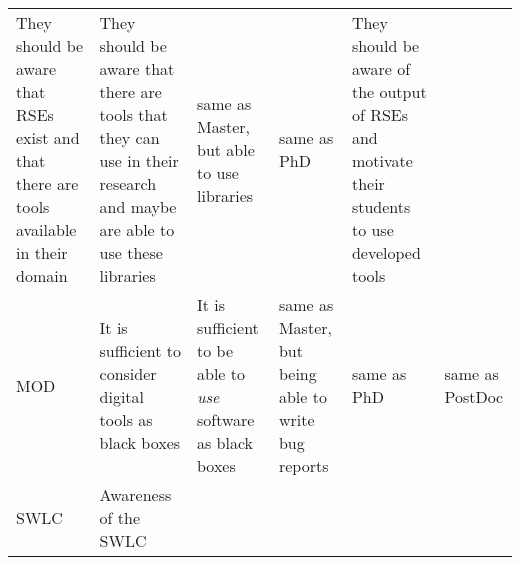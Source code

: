 \documentclass[a4paper
]{article}
\begin{document}
\begin{landscape}
\begin{longtable}[]{@{}llllll@{}}
\begin{minipage}[t]{0.18\columnwidth}
They should be aware that RSEs exist and that there are tools available
in their domain\strut
\end{minipage} & \begin{minipage}[t]{0.18\columnwidth}\raggedright
They should be aware that there are tools that they can use in their
research and maybe are able to use these libraries\strut
\end{minipage} & \begin{minipage}[t]{0.09\columnwidth}\raggedright
same as Master, but able to use libraries\strut
\end{minipage} & \begin{minipage}[t]{0.18\columnwidth}\raggedright
same as PhD\strut
\end{minipage} & \begin{minipage}[t]{0.09\columnwidth}\raggedright
They should be aware of the output of RSEs and motivate their students
to use developed tools\strut
\end{minipage}\tabularnewline
\begin{minipage}[t]{0.12\columnwidth}\raggedright
MOD\strut
\end{minipage} & \begin{minipage}[t]{0.18\columnwidth}\raggedright
It is sufficient to consider digital tools as black boxes\strut
\end{minipage} & \begin{minipage}[t]{0.18\columnwidth}\raggedright
It is sufficient to be able to \emph{use} software as black boxes\strut
\end{minipage} & \begin{minipage}[t]{0.09\columnwidth}\raggedright
same as Master, but being able to write bug reports\strut
\end{minipage} & \begin{minipage}[t]{0.18\columnwidth}\raggedright
same as PhD\strut
\end{minipage} & \begin{minipage}[t]{0.09\columnwidth}\raggedright
same as PostDoc\strut
\end{minipage}\tabularnewline
\begin{minipage}[t]{0.12\columnwidth}\raggedright
SWLC\strut
\end{minipage} & \begin{minipage}[t]{0.18\columnwidth}\raggedright
Awareness of the SWLC\strut
\end{minipage} & \begin{minipage}[t]{0.18\columnwidth}\raggedright

\end{minipage}
\end{longtable}
\end{landscape}
\end{document}
